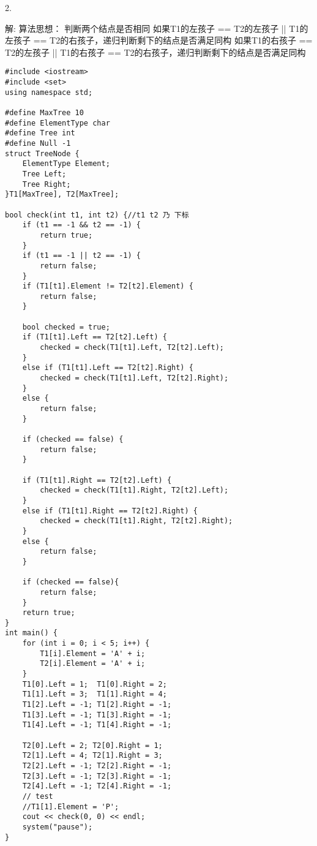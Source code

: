 2.\newline

解:\newline
算法思想：\newline
判断两个结点是否相同\newline
如果T1的左孩子 == T2的左孩子 || T1的左孩子 == T2的右孩子，递归判断剩下的结点是否满足同构\newline
如果T1的右孩子 == T2的左孩子 || T1的右孩子 == T2的右孩子，递归判断剩下的结点是否满足同构\newline
\begin{lstlisting}[basicstyle=\small\ttfamily, caption={}, numbers=none]
#include <iostream>
#include <set>
using namespace std;

#define MaxTree 10
#define ElementType char
#define Tree int
#define Null -1
struct TreeNode {
	ElementType Element;
	Tree Left;
	Tree Right;
}T1[MaxTree], T2[MaxTree];

bool check(int t1, int t2) {//t1 t2 乃 下标
	if (t1 == -1 && t2 == -1) {
		return true;
	}
	if (t1 == -1 || t2 == -1) {
		return false;
	}
	if (T1[t1].Element != T2[t2].Element) {
		return false;
	}

	bool checked = true;
	if (T1[t1].Left == T2[t2].Left) {
		checked = check(T1[t1].Left, T2[t2].Left);
	}
	else if (T1[t1].Left == T2[t2].Right) {
		checked = check(T1[t1].Left, T2[t2].Right);
	}
	else {
		return false;
	}

	if (checked == false) {
		return false;
	}

	if (T1[t1].Right == T2[t2].Left) {
		checked = check(T1[t1].Right, T2[t2].Left);
	}
	else if (T1[t1].Right == T2[t2].Right) {
		checked = check(T1[t1].Right, T2[t2].Right);
	}
	else {
		return false;
	}

	if (checked == false){
		return false;
	}
	return true;
}
int main() {
	for (int i = 0; i < 5; i++) {
		T1[i].Element = 'A' + i;
		T2[i].Element = 'A' + i;
	}
	T1[0].Left = 1;  T1[0].Right = 2;
	T1[1].Left = 3;  T1[1].Right = 4;
	T1[2].Left = -1; T1[2].Right = -1;
	T1[3].Left = -1; T1[3].Right = -1;
	T1[4].Left = -1; T1[4].Right = -1;

	T2[0].Left = 2; T2[0].Right = 1;
	T2[1].Left = 4; T2[1].Right = 3;
	T2[2].Left = -1; T2[2].Right = -1;
	T2[3].Left = -1; T2[3].Right = -1;
	T2[4].Left = -1; T2[4].Right = -1;
	// test
	//T1[1].Element = 'P';
	cout << check(0, 0) << endl;
	system("pause");
}
\end{lstlisting}

